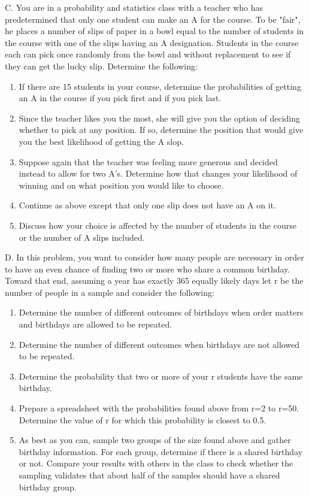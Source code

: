 \documentclass[10pt,]{book}
\theoremstyle{plain}
\theoremstyle{definition}
\theoremstyle{definition}
\theoremstyle{definition}
\numberwithin{equation}{section}
\begin{document}
	C. You are in a probability and statistics class with a teacher who has predetermined that only one student can make an A for the course. To be "fair", he places a number of slips of paper in a bowl equal to the number of students in the course with one of the slips having an A designation. Students in the course each can pick once randomly from the bowl and without replacement to see if they can get the lucky slip.  Determine the following:
	\leavevmode%
\begin{enumerate}
\item\hypertarget{li-119}{}If there are 15 students in your course, determine the probabilities of getting an A in the course if you pick first and if you pick last.%
\item\hypertarget{li-120}{}Since the teacher likes you the most, she will give you the option of deciding whether to pick at any position. If so, determine the position that would give you the best likelihood of getting the A slop.%
\item\hypertarget{li-121}{}Suppose again that the teacher was feeling more generous and decided instead to allow for two A's. Determine how that changes your likelihood of winning and on what position you would like to choose.%
\item\hypertarget{li-122}{}Continue as above except that only one slip does not have an A on it.%
\item\hypertarget{li-123}{}Discuss how your choice is affected by the number of students in the course or the number of A slips included.%
\end{enumerate}

\par

	D. In this problem, you want to consider how many people are necessary in order to have an even chance of finding two or more who share a common birthday. Toward that end, assuming a year has exactly 365 equally likely days let r be the number of people in a sample and consider the following:
	\leavevmode%
\begin{enumerate}
\item\hypertarget{li-124}{}Determine the number of different outcomes of birthdays when order matters and birthdays are allowed to be repeated.%
\item\hypertarget{li-125}{}Determine the number of different outcomes when birthdays are not allowed to be repeated.%
\item\hypertarget{li-126}{}Determine the probability that two or more of your r students have the same birthday.%
\item\hypertarget{li-127}{}Prepare a spreadsheet with the probabilities found above from r=2 to r=50. Determine the value of r for which this probability is closest to 0.5.%
\item\hypertarget{li-128}{}As best as you can, sample two groups of the size found above and gather birthday information. For each group, determine if there is a shared birthday or not.  Compare your results with others in the class to check whether the sampling validates that about half of the samples should have a shared birthday group.%
\end{enumerate}
\end{document}
